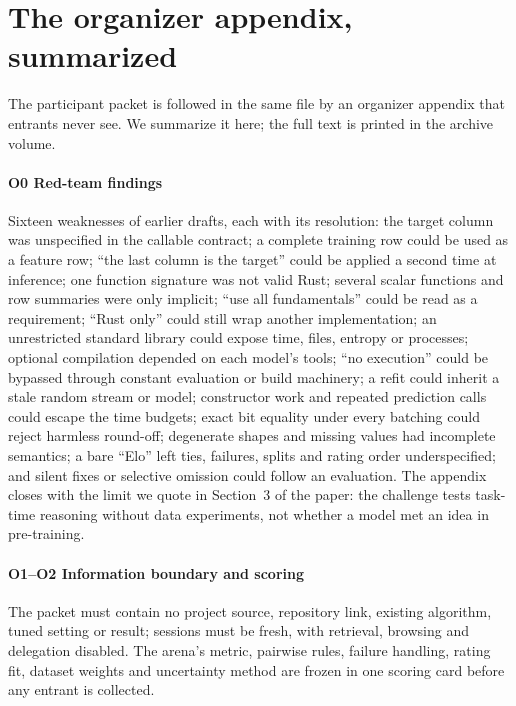 \section{The organizer appendix, summarized}
\label{sup:organizer}

The participant packet is followed in the same file by an organizer appendix that entrants never
see. We summarize it here; the full text is printed in the archive volume.

\paragraph{O0 Red-team findings} Sixteen weaknesses of earlier drafts, each with its resolution:
the target column was unspecified in the callable contract; a complete training row could be used as
a feature row; ``the last column is the target'' could be applied a second time at inference; one
function signature was not valid Rust; several scalar functions and row summaries were only
implicit; ``use all fundamentals'' could be read as a requirement; ``Rust only'' could still wrap
another implementation; an unrestricted standard library could expose time, files, entropy or
processes; optional compilation depended on each model's tools; ``no execution'' could be bypassed
through constant evaluation or build machinery; a refit could inherit a stale random stream or
model; constructor work and repeated prediction calls could escape the time budgets; exact bit
equality under every batching could reject harmless round-off; degenerate shapes and missing values
had incomplete semantics; a bare ``Elo'' left ties, failures, splits and rating order underspecified;
and silent fixes or selective omission could follow an evaluation. The appendix closes with the
limit we quote in Section~3 of the paper: the challenge tests task-time reasoning without data
experiments, not whether a model met an idea in pre-training.

\paragraph{O1--O2 Information boundary and scoring} The packet must contain no project source,
repository link, existing algorithm, tuned setting or result; sessions must be fresh, with retrieval,
browsing and delegation disabled. The arena's metric, pairwise rules, failure handling, rating fit,
dataset weights and uncertainty method are frozen in one scoring card before any entrant is collected.


